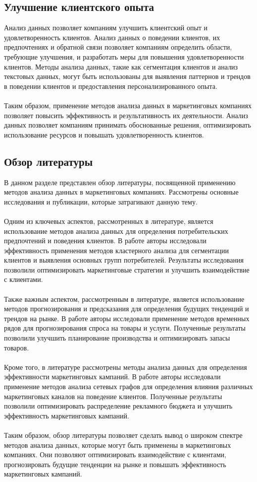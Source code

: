 \documentclass{article}
\begin{document}
\subsection{Улучшение клиентского опыта}
Анализ данных позволяет компаниям улучшить клиентский опыт и удовлетворенность клиентов. Анализ данных о поведении клиентов, их предпочтениях и обратной связи позволяет компаниям определить области, требующие улучшения, и разработать меры для повышения удовлетворенности клиентов. Методы анализа данных, такие как сегментация клиентов и анализ текстовых данных, могут быть использованы для выявления паттернов и трендов в поведении клиентов и предоставления персонализированного опыта.\\
~\\
Таким образом, применение методов анализа данных в маркетинговых компаниях позволяет повысить эффективность и результативность их деятельности. Анализ данных позволяет компаниям принимать обоснованные решения, оптимизировать использование ресурсов и повышать удовлетворенность клиентов.
\subsection{Обзор литературы}
В данном разделе представлен обзор литературы, посвященной применению методов анализа данных в маркетинговых компаниях. Рассмотрены основные исследования и публикации, которые затрагивают данную тему.\\
~\\
Одним из ключевых аспектов, рассмотренных в литературе, является использование методов анализа данных для определения потребительских предпочтений и поведения клиентов. В работе \cite{ref1} авторы исследовали эффективность применения методов кластерного анализа для сегментации клиентов и выявления основных групп потребителей. Результаты исследования позволили оптимизировать маркетинговые стратегии и улучшить взаимодействие с клиентами.\\
~\\
Также важным аспектом, рассмотренным в литературе, является использование методов прогнозирования и предсказания для определения будущих тенденций и трендов на рынке. В работе \cite{ref2} авторы исследовали применение методов временных рядов для прогнозирования спроса на товары и услуги. Полученные результаты позволили улучшить планирование производства и оптимизировать запасы товаров.\\
~\\
Кроме того, в литературе рассмотрены методы анализа данных для определения эффективности маркетинговых кампаний. В работе \cite{ref3} авторы исследовали применение методов анализа сетевых графов для определения влияния различных маркетинговых каналов на поведение клиентов. Полученные результаты позволили оптимизировать распределение рекламного бюджета и улучшить эффективность маркетинговых кампаний.\\
~\\
Таким образом, обзор литературы позволяет сделать вывод о широком спектре методов анализа данных, которые могут быть применены в маркетинговых компаниях. Они позволяют оптимизировать взаимодействие с клиентами, прогнозировать будущие тенденции на рынке и повышать эффективность маркетинговых кампаний.
\end{document}
